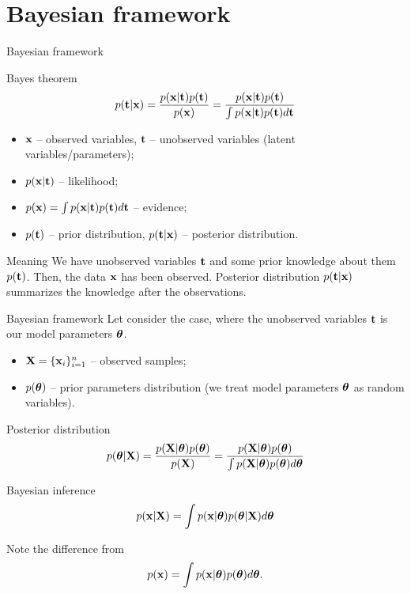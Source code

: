 \section{Bayesian framework}
\begin{frame}{Bayesian framework}
	\begin{block}{Bayes theorem}
		\[
			p(\mathbf{t} | \mathbf{x}) = \frac{p(\mathbf{x} | \mathbf{t}) p(\mathbf{t})}{p(\mathbf{x})} = \frac{p(\mathbf{x} | \mathbf{t}) p(\mathbf{t})}{\int p(\mathbf{x} | \mathbf{t}) p(\mathbf{t}) d \mathbf{t}} 
		\]
		\begin{itemize}
			\item $\mathbf{x}$ -- observed variables, $\mathbf{t}$ -- unobserved variables (latent variables/parameters);
			\item $p(\mathbf{x} | \mathbf{t})$ -- likelihood;
			\item $p(\mathbf{x}) = \int p(\mathbf{x} | \mathbf{t}) p(\mathbf{t}) d \mathbf{t}$ -- evidence;
			\item $p(\mathbf{t})$ -- prior distribution, $p(\mathbf{t} | \mathbf{x})$ -- posterior distribution.
		\end{itemize}
	\end{block}
	\begin{block}{Meaning}
		We have unobserved variables $\mathbf{t}$ and some prior knowledge about them $p(\mathbf{t})$. Then, the data $\mathbf{x}$ has been observed. 
		Posterior distribution $p(\mathbf{t} | \mathbf{x})$ summarizes the knowledge after the observations.
	\end{block}
\end{frame}
\begin{frame}{Bayesian framework}
	Let consider the case, where the unobserved variables $\mathbf{t}$ is our model parameters $\boldsymbol{\theta}$.
	\begin{itemize}
		\item $\mathbf{X} = \{\mathbf{x}_i\}_{i=1}^n$ -- observed samples;
		\item $p(\boldsymbol{\theta})$ -- prior parameters distribution (we treat model parameters $\boldsymbol{\theta}$ as random variables).
	\end{itemize}
	\begin{block}{Posterior distribution}
		\vspace{-0.3cm}
		\[
			p(\boldsymbol{\theta} | \mathbf{X}) = \frac{p(\mathbf{X} | \boldsymbol{\theta}) p(\boldsymbol{\theta})}{p(\mathbf{X})} = \frac{p(\mathbf{X} | \boldsymbol{\theta}) p(\boldsymbol{\theta})}{\int p(\mathbf{X} | \boldsymbol{\theta}) p(\boldsymbol{\theta}) d \boldsymbol{\theta}} 
		\]
		\vspace{-0.3cm}
	\end{block}
	\begin{block}{Bayesian inference}
		\vspace{-0.3cm}
		\[
			p(\mathbf{x} | \mathbf{X}) = \int p(\mathbf{x} | \boldsymbol{\theta}) p(\boldsymbol{\theta} | \mathbf{X}) d \boldsymbol{\theta}
		\]
		\vspace{-0.3cm}
	\end{block}
 	Note the difference from
	 	\[
	 		p(\mathbf{x}) = \int p(\mathbf{x} | \boldsymbol{\theta}) p(\boldsymbol{\theta}) d \boldsymbol{\theta}.
	 	\]
\end{frame}
